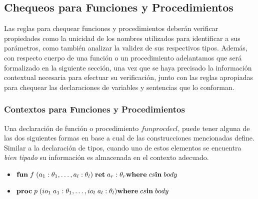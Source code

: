\subsection{Chequeos para Funciones y Procedimientos}

Las reglas para chequear funciones y procedimientos deberán verificar propiedades como la unicidad de los nombres utilizados para identificar a sus parámetros, como también analizar la validez de sus respectivos tipos.
Además, con respecto cuerpo de una función o un procedimiento adelantamos que será formalizado en la siguiente sección, una vez que se haya precisado la información contextual necesaria para efectuar su verificación, junto con las reglas apropiadas para chequear las declaraciones de variables y sentencias que lo conforman.

\subsubsection{Contextos para Funciones y Procedimientos}

Una declaración de función o procedimiento $funprocdecl$, puede tener alguna de las dos siguientes formas en base a cual de las construcciones mencionadas define.
Similar a la declaración de tipos, cuando uno de estos elementos se encuentra \textit{bien tipado} su información es almacenada en el contexto adecuado.

\begin{itemize}
    \item
    $
    \mathbf{fun} \; f \; (a_1: \theta_1, \ldots, a_l: \theta_l) \; \mathbf{ret} \; a_r: \theta_r
    \\
    \mathbf{where} \; cs
    \\
    \mathbf{in} \; body
    $
    \item
    $
    \mathbf{proc} \; p \; (io_1 \; a_1: \theta_1, \ldots, io_l \; a_l: \theta_l)
    \\
    \mathbf{where} \; cs
    \\
    \mathbf{in} \; body
    $
\end{itemize}

